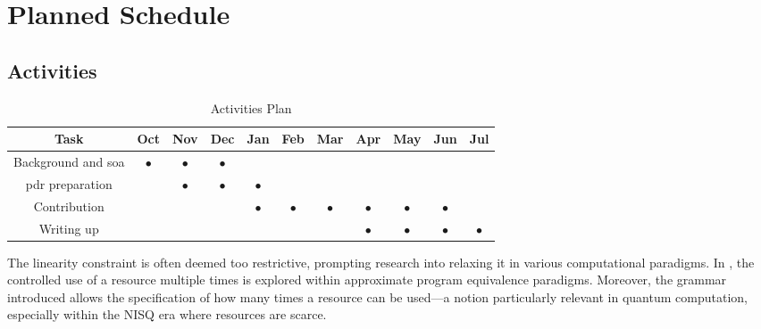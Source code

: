\chapter{Planned Schedule}

\section{Activities}


\begin{table}[H]
\begin{center}
\begin{tabular}{| c | c | c | c | c | c | c | c | c | c | c |}
\hline
\textbf{Task} & \textbf{Oct} & \textbf{Nov} & \textbf{Dec} & \textbf{Jan} & \textbf{Feb} & \textbf{Mar} & \textbf{Apr} & \textbf{May} & \textbf{Jun} & \textbf{Jul}\\
\hline
Background and \acrshort{soa} & $\bullet$ & $\bullet$ & $\bullet$ & & & & & & & \\
\hline
\acrshort{pdr} preparation & & $\bullet$ & $\bullet$ & $\bullet$ & & & & & & \\
\hline
Contribution & & & &$\bullet$ &$\bullet$ &$\bullet$ &$\bullet$ &$\bullet$ &$\bullet$ & \\
\hline
Writing up & & & & & & & $\bullet$ & $\bullet$ & $\bullet$ & $\bullet$ \\
\hline
\end{tabular}
\end{center}
\caption{Activities Plan}
\end{table}



The linearity
constraint is often deemed too restrictive, prompting research into relaxing it in various computational paradigms. In \cite{dahlqvist2023complete}, the controlled use of a resource multiple times is explored within approximate program equivalence paradigms. Moreover, the grammar introduced allows the specification of how many times a resource can be used—a notion particularly relevant in quantum computation, especially within the NISQ era where resources are scarce.

